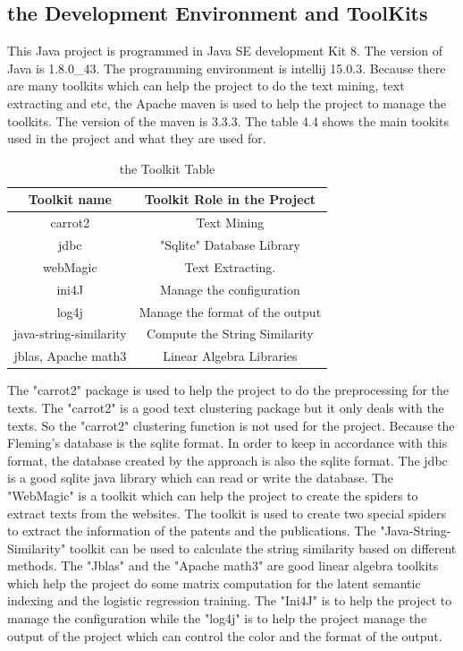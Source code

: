 \subsection{the Development Environment and ToolKits}
This Java project is programmed in Java SE development Kit 8. The version of Java is 1.8.0\_43. The programming environment is intellij 15.0.3. Because there are many toolkits which can help the project to do the text mining, text extracting and etc, the Apache maven is used to help the project to manage the toolkits. The version of the maven is 3.3.3. The table 4.4 shows the main tookits used in the project and what they are used for.  \newline

\begin{table}[b]
\centering

\begin{tabular}{|c|c|}
\hline
Toolkit name & Toolkit Role in the Project \\
\hline
carrot2 & Text Mining \\
\hline
jdbc  & "Sqlite" Database Library \\ 
\hline
webMagic & Text Extracting.\\
\hline
ini4J& Manage the configuration \\
\hline
log4j & Manage the format of the output \\
\hline
java-string-similarity & Compute the String Similarity \\
\hline
jblas, Apache math3 & Linear Algebra Libraries \\
\hline

\end{tabular}

\caption{the Toolkit Table}
\end{table}

The "carrot2" package is used to help the project to do the preprocessing for the texts. The "carrot2" is a good text clustering package but it only deals with the texts. So the "carrot2" clustering function is not used for the project. Because the Fleming's database is the sqlite format. In order to keep in accordance with this format, the database created by the approach is also  the sqlite format. The jdbc is a good sqlite java library which can read or write the database. The "WebMagic" is a toolkit which can help the project to create the spiders to extract texts from the websites. The toolkit is used to create two special spiders to extract the information of the patents and the publications. The "Java-String-Similarity" toolkit can be used to calculate the string similarity based on different methods. The "Jblas" and the "Apache math3" are good linear algebra toolkits which help the project do some matrix computation for the latent semantic indexing and the logistic regression training. The "Ini4J" is to help the project to manage the configuration while the "log4j" is to help the project manage the output of the project which can control the color and the format of the output. 


